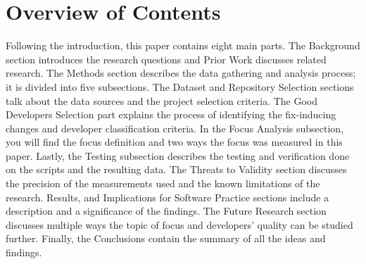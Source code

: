 \section{Overview of Contents}
Following the introduction, this paper contains eight main parts. The Background section introduces the research questions and Prior Work discusses related research. The Methods section describes the data gathering and analysis process; it is divided into five subsections. The Dataset and Repository Selection sections talk about the data sources and the project selection criteria. The Good Developers Selection part explains the process of identifying the fix-inducing changes and developer classification criteria. In the Focus Analysis subsection, you will find the focus definition and two ways the focus was measured in this paper. Lastly, the Testing subsection describes the testing and verification done on the scripts and the resulting data. The Threats to Validity section discusses the precision of the measurements used and the known limitations of the research. Results, and Implications for Software Practice sections include a description and a significance of the findings. The Future Research section discusses multiple ways the topic of focus and developers’ quality can be studied further. Finally, the Conclusions contain the summary of all the ideas and findings.



